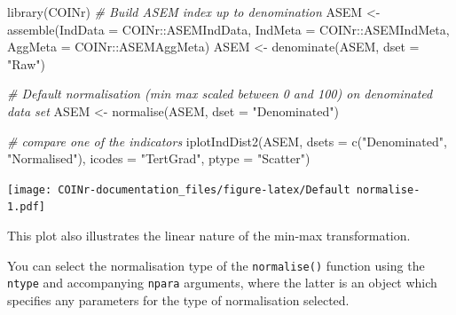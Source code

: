 \documentclass[
]{book}
\newenvironment{Shaded}{\begin{snugshade}}{\end{snugshade}}
\newcommand{\AttributeTok}[1]{\textcolor[rgb]{0.77,0.63,0.00}{#1}}
\newcommand{\CommentTok}[1]{\textcolor[rgb]{0.56,0.35,0.01}{\textit{#1}}}
\newcommand{\FunctionTok}[1]{\textcolor[rgb]{0.00,0.00,0.00}{#1}}
\newcommand{\NormalTok}[1]{#1}
\newcommand{\OtherTok}[1]{\textcolor[rgb]{0.56,0.35,0.01}{#1}}
\newcommand{\SpecialCharTok}[1]{\textcolor[rgb]{0.00,0.00,0.00}{#1}}
\newcommand{\StringTok}[1]{\textcolor[rgb]{0.31,0.60,0.02}{#1}}
\begin{document}
\begin{Shaded}
\begin{Highlighting}[]
\FunctionTok{library}\NormalTok{(COINr)}
\CommentTok{\# Build ASEM index up to denomination}
\NormalTok{ASEM }\OtherTok{\textless{}{-}} \FunctionTok{assemble}\NormalTok{(}\AttributeTok{IndData =}\NormalTok{ COINr}\SpecialCharTok{::}\NormalTok{ASEMIndData, }\AttributeTok{IndMeta =}\NormalTok{ COINr}\SpecialCharTok{::}\NormalTok{ASEMIndMeta, }\AttributeTok{AggMeta =}\NormalTok{ COINr}\SpecialCharTok{::}\NormalTok{ASEMAggMeta)}
\NormalTok{ASEM }\OtherTok{\textless{}{-}} \FunctionTok{denominate}\NormalTok{(ASEM, }\AttributeTok{dset =} \StringTok{"Raw"}\NormalTok{)}

\CommentTok{\# Default normalisation (min max scaled between 0 and 100) on denominated data set}
\NormalTok{ASEM }\OtherTok{\textless{}{-}} \FunctionTok{normalise}\NormalTok{(ASEM, }\AttributeTok{dset =} \StringTok{"Denominated"}\NormalTok{)}

\CommentTok{\# compare one of the indicators}
\FunctionTok{iplotIndDist2}\NormalTok{(ASEM, }\AttributeTok{dsets =} \FunctionTok{c}\NormalTok{(}\StringTok{"Denominated"}\NormalTok{, }\StringTok{"Normalised"}\NormalTok{),}
              \AttributeTok{icodes =} \StringTok{"TertGrad"}\NormalTok{, }\AttributeTok{ptype =} \StringTok{"Scatter"}\NormalTok{)}
\end{Highlighting}
\end{Shaded}

\texttt{[image: COINr-documentation\_files/figure-latex/Default normalise-1.pdf]}

This plot also illustrates the linear nature of the min-max transformation.

You can select the normalisation type of the \texttt{normalise()} function using the \texttt{ntype} and accompanying \texttt{npara} arguments, where the latter is an object which specifies any parameters for the type of normalisation selected.
\end{document}

